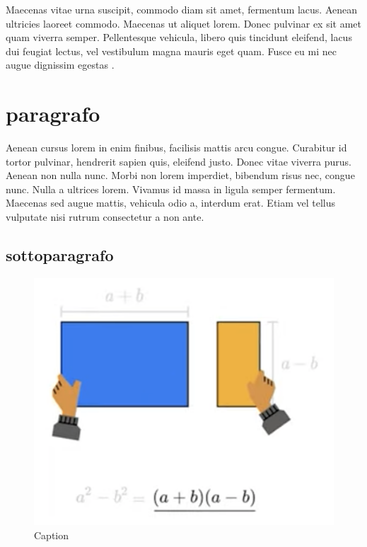 \documentclass[a4paper, 11pt, oneside]{book}
\begin{document}
Maecenas vitae urna suscipit, commodo diam sit amet, fermentum lacus. Aenean ultricies laoreet commodo. Maecenas ut aliquet lorem. Donec pulvinar ex sit amet quam viverra semper. Pellentesque vehicula, libero quis tincidunt eleifend, lacus dui feugiat lectus, vel vestibulum magna mauris eget quam. Fusce eu mi nec augue dignissim egestas \cite{20, 33, dep}.

\section{paragrafo}\label{sec:prova}

Aenean cursus lorem in enim finibus, facilisis mattis arcu congue. Curabitur id tortor pulvinar, hendrerit sapien quis, eleifend justo. Donec vitae viverra purus. Aenean non nulla nunc. Morbi non lorem imperdiet, bibendum risus nec, congue nunc. Nulla a ultrices lorem. Vivamus id massa in ligula semper fermentum. Maecenas sed augue mattis, vehicula odio a, interdum erat. Etiam vel tellus vulputate nisi rutrum consectetur a non ante.

\subsection{sottoparagrafo}\label{subsec:prova}

\begin{figure}
    \centering
    \includegraphics{figura.png}
    \caption{Caption}
    \label{fig:my_label}
\end{figure}
\end{document}
